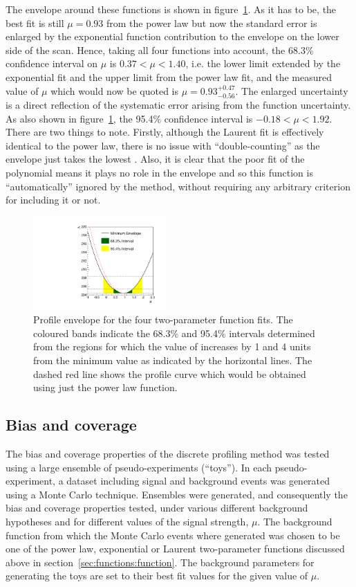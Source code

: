 The envelope around these functions is shown in
figure~\ref{fig:functions:envelope}.
As it has to be, the best fit is still $\mu=0.93$ from the power law
but now the standard error is enlarged by the exponential function
contribution to the
envelope on the lower side of the scan. Hence, taking all four functions into
account, the 68.3\% confidence interval on $\mu$ is
$0.37 < \mu < 1.40 $, i.e. the lower limit extended by 
the exponential fit and the upper limit from the power law fit,
and the measured value of $\mu$ which would now be quoted is 
$\mu = 0.93_{-0.56}^{+0.47}$.
The enlarged uncertainty is a direct reflection of the
systematic error arising from the function uncertainty.
As also shown in figure~\ref{fig:functions:envelope}, the 95.4\% confidence 
interval is $-0.18 < \mu < 1.92$.
There are two things to note. Firstly, although the Laurent fit
is effectively identical to the power law, there is no issue with 
``double-counting'' as the envelope just takes the lowest \nll.
Also, it is clear that the poor fit of the polynomial
means it plays no role in the envelope and so this function is 
``automatically'' ignored by the method,
without requiring any arbitrary criterion for
including it or not.
%
\begin{figure}[tbp]
\centering
\includegraphics[width=0.45\textwidth]{functions/Envelope.pdf}
\caption{Profile \nll envelope for the four two-parameter function fits.
The coloured bands indicate the 68.3\% and 95.4\% intervals determined from the regions 
for which the value of \nll increases by 1 and 4 units from the minimum value as indicated by the horizontal lines. The dashed red line shows the profile \nll
curve which would be obtained using just the power law function.}
\label{fig:functions:envelope}
\end{figure}


\subsection{Bias and coverage}
\label{sec:functions:coverage}

The bias and coverage properties of the discrete profiling method was tested 
using a large ensemble of
pseudo-experiments (``toys''). In each pseudo-experiment, a 
dataset including signal and background events was generated using a Monte Carlo technique. 
Ensembles were generated, and consequently the bias and coverage properties tested, under various different background hypotheses and for different values of the signal strength, $\mu$. The background function from which the Monte Carlo events where generated was chosen to be one of the power law,
exponential or Laurent two-parameter functions discussed above in 
section~\ref{sec:functions:function}. The background parameters for generating the toys are set to their best fit values for the given value of $\mu$. 

